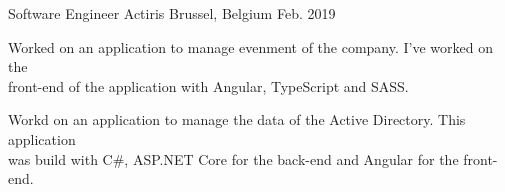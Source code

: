 \begin{cventries}
  \cventry
    {Software Engineer}
    {Actiris}
    {Brussel, Belgium}
    {Feb. 2019}
    {
      \begin{cvitems}
        \item Worked on an application to manage evenment of the company. I've worked on the\\front-end of the application with Angular, TypeScript and SASS.
        \item Workd on an application to manage the data of the Active Directory. This application\\was build with C\#, ASP.NET Core for the back-end and Angular for the front-end.
      \end{cvitems}
    }

\end{cventries}

